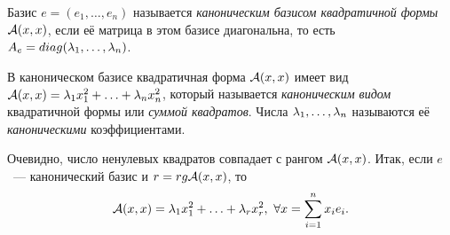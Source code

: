 \begin{definition}
Базис $e=(e_1,\ldots,e_n)$ называется \emph{каноническим базисом квадратичной формы} ${\mathcal{A}}(x,x)$, если её матрица в этом базисе диагональна, то есть $A_e=diag(\lambda_1,\ldots,\lambda_n)$.
\end{definition}

\begin{definition}
В каноническом базисе квадратичная форма ${\mathcal{A}}(x,x)$ имеет вид ${\mathcal{A}}(x,x)=\lambda_1x_1^2+\ldots+\lambda_nx_n^2$, который называется \emph{каноническим видом} квадратичной формы или \emph{суммой квадратов}. Числа $\lambda_1,\ldots,\lambda_n$ называются её \emph{каноническими} коэффициентами.
\end{definition}

\begin{Commentwhite}
Очевидно, число ненулевых квадратов совпадает с рангом ${\mathcal{A}}(x,x)$. Итак, если $e$~--- канонический базис и $r=rg{\mathcal{A}}(x,x)$, то
\begin{equation}
\label{eq канон. вид квадр. формы}
    {\mathcal{A}}(x,x)=\lambda_1x_1^2+\ldots+\lambda_rx_r^2,~\forall x=\sum_{i=1}^nx_ie_i.
\end{equation}
\end{Commentwhite}

